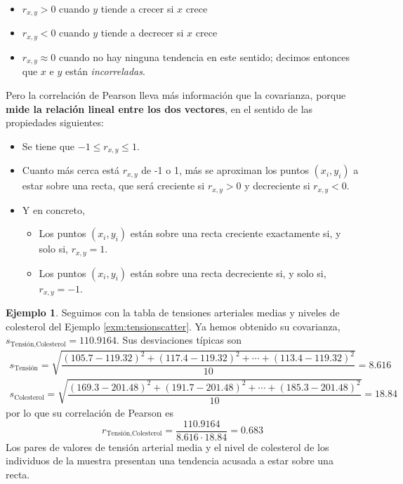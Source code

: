 \documentclass[
]{book}
\providecommand{\tightlist}{%
  \setlength{\itemsep}{0pt}\setlength{\parskip}{0pt}}
\theoremstyle{definition}
\theoremstyle{definition}
\newtheorem{example}{Ejemplo}[chapter]
\theoremstyle{definition}
\theoremstyle{definition}
\theoremstyle{remark}
\begin{document}
\begin{itemize}
\tightlist
\item
  \(r_{x,y}>0\) cuando \(y\) tiende a crecer si \(x\) crece
\item
  \(r_{x,y}<0\) cuando \(y\) tiende a decrecer si \(x\) crece
\item
  \(r_{x,y}\approx 0\) cuando no hay ninguna tendencia en este sentido; decimos entonces que \(x\) e \(y\) están \emph{incorreladas}.
\end{itemize}

Pero la correlación de Pearson lleva más información que la covarianza, porque
\textbf{mide la relación lineal entre los dos vectores}, en el sentido de las propiedades siguientes:

\begin{itemize}
\item
  Se tiene que \(-1\leqslant r_{x,y}\leqslant 1\).
\item
  Cuanto más cerca está \(r_{x,y}\) de -1 o 1, más se aproximan los puntos \((x_i,y_i)\) a estar sobre una recta, que será creciente si \(r_{x,y}>0\) y decreciente si \(r_{x,y}<0\).
\item
  Y en concreto,

  \begin{itemize}
  \tightlist
  \item
    Los puntos \((x_i,y_i)\) están sobre una recta creciente exactamente si, y solo si, \(r_{x,y}=1\).
  \item
    Los puntos \((x_i,y_i)\) están sobre una recta decreciente si, y solo si, \(r_{x,y}=-1\).
  \end{itemize}
\end{itemize}

\begin{example}
\protect\hypertarget{exm:unnamed-chunk-311}{}\label{exm:unnamed-chunk-311}Seguimos con la tabla de tensiones arteriales medias y niveles de colesterol del Ejemplo \ref{exm:tensionscatter}. Ya hemos obtenido su covarianza, \(s_{\text{Tensión},\text{Colesterol}}=110.9164\). Sus desviaciones típicas son
\[
\begin{array}{l}
s_{\text{Tensión}}=\sqrt{\dfrac{(105.7-119.32)^2+(117.4-119.32)^2+\cdots+(113.4-119.32)^2}{10}}=8.616\\
s_{\text{Colesterol}}=\sqrt{\dfrac{(169.3-201.48)^2+(191.7-201.48)^2+\cdots+(185.3-201.48)^2}{10}}=18.84
\end{array}
\]
por lo que su correlación de Pearson es
\[
r_{\text{Tensión},\text{Colesterol}}=\frac{110.9164}{8.616\cdot 18.84}=0.683
\]
Los pares de valores de tensión arterial media y el nivel de colesterol de los individuos de la muestra presentan una tendencia acusada a estar sobre una recta.
\end{example}
\end{document}
